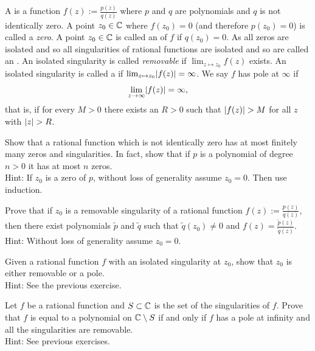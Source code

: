 \pagebreak[1]
\begin{exnote}
A \emph{} is a function
$f(z) := \frac{p(z)}{q(z)}$
where $p$ and $q$ are polynomials and $q$ is not identically zero.
A point $z_0 \in {\mathbb{C}}$ where $f(z_0) = 0$ (and therefore $p(z_0) = 0$)
is called a \emph{zero}.
A point $z_0 \in {\mathbb{C}}$ is called an \emph{} of
$f$ if $q(z_0) = 0$.  As all zeros are isolated and so
all singularities of rational functions are isolated
and so are called
an \emph{}.
An isolated singularity is called
\emph{removable}
if $\lim_{z \mapsto z_0} f(z)$ exists.
An isolated singularity is called a \emph{} if 
$\lim_{z \mapsto z_0} \lvert {f(z)} \rvert = \infty$.
We say $f$ has pole at $\infty$ if
\begin{equation*}
\lim_{z \to \infty} \lvert {f(z)} \rvert = \infty ,
\end{equation*}
that is, if for every $M > 0$ there exists an $R > 0$ such that
$\lvert {f(z)} \rvert > M$ for all $z$ with $\lvert {z} \rvert > R$.
\end{exnote}

\begin{exercise}
Show that a rational function which is not identically
zero has at most finitely many zeros and
singularities.  In fact, show that if $p$ is a polynomial of 
degree $n > 0$ it has at most $n$ zeros.
\\
Hint: If $z_0$ is a zero of $p$, without loss of generality assume $z_0 =
0$.  Then use induction.
\end{exercise}

\begin{exercise}
Prove that if $z_0$ is a removable singularity of a rational
function $f(z) := \frac{p(z)}{q(z)}$, then there exist
polynomials $\widetilde{p}$ and $\widetilde{q}$ such that
$\widetilde{q}(z_0) \not= 0$ and $f(z) =
\frac{\widetilde{p}(z)}{\widetilde{q}(z)}$.
\\
Hint: Without loss of generality assume $z_0 = 0$.
\end{exercise}

\begin{exercise}
Given a rational function $f$ with an isolated singularity at $z_0$,
show that $z_0$ is either removable or a pole.
\\
Hint: See the previous exercise.
\end{exercise}

\begin{exercise}
Let $f$ be a rational function and $S \subset {\mathbb{C}}$ is the 
set of the singularities of $f$.
Prove that $f$ is equal to a polynomial on ${\mathbb{C}} \setminus S$
if and only if
$f$ has a pole at infinity and all the singularities are removable.
\\
Hint: See previous exercises.
\end{exercise}



